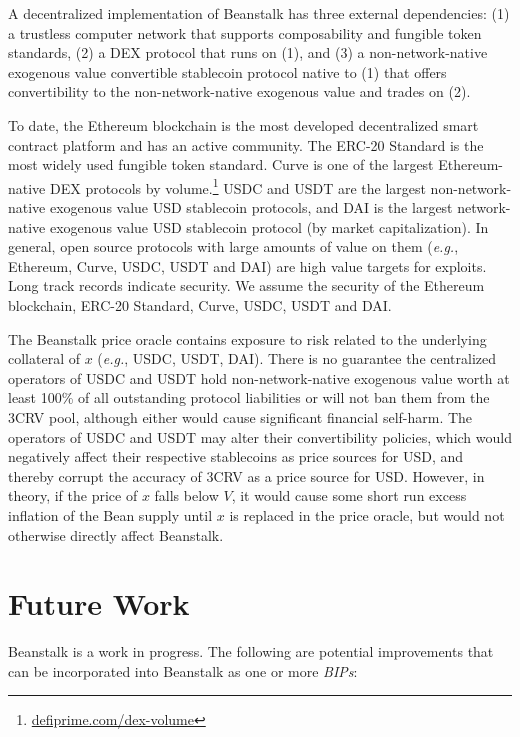 \documentclass[tikz]{article}
\newcommand{\term}[1]{\textsl{#1}}
\newcommand{\fref}[1]{\footnote{\href{http://#1}{#1}}}
\begin{document}
A decentralized implementation of Beanstalk has three external dependencies: (1) a trustless computer network that supports composability and fungible token standards, (2) a DEX protocol that runs on (1), and (3) a non-network-native exogenous value convertible stablecoin protocol native to (1) that offers convertibility to the non-network-native exogenous value and trades on (2). 

To date, the Ethereum blockchain is the most developed decentralized smart contract platform and has an active community. The ERC-20 Standard is the most widely used fungible token standard. Curve is one of the largest Ethereum-native DEX protocols by volume.\fref{defiprime.com/dex-volume} USDC and USDT are the largest non-network-native exogenous value USD stablecoin protocols, and DAI is the largest network-native exogenous value USD stablecoin protocol (by market capitalization). In general, open source protocols with large amounts of value on them (\term{e.g.}, Ethereum, Curve, USDC, USDT and DAI) are high value targets for exploits. Long track records indicate security. We assume the security of the Ethereum blockchain, ERC-20 Standard, Curve, USDC, USDT and DAI.

The Beanstalk price oracle contains exposure to risk related to the underlying collateral of $x$ (\term{e.g.}, USDC, USDT, DAI). There is no guarantee the centralized operators of USDC and USDT hold non-network-native exogenous value worth at least 100\% of all outstanding protocol liabilities or will not ban them from the 3CRV pool, although either would cause significant financial self-harm. The operators of USDC and USDT may alter their convertibility policies, which would negatively affect their respective stablecoins as price sources for USD, and thereby corrupt the accuracy of 3CRV as a price source for USD. However, in theory, if the price of $x$ falls below $V$, it would cause some short run excess inflation of the Bean supply until $x$ is replaced in the price oracle, but would not otherwise directly affect Beanstalk.

\section{Future Work}
Beanstalk is a work in progress. The following are potential improvements that can be incorporated into Beanstalk as one or more \term{BIPs}:
\end{document}

